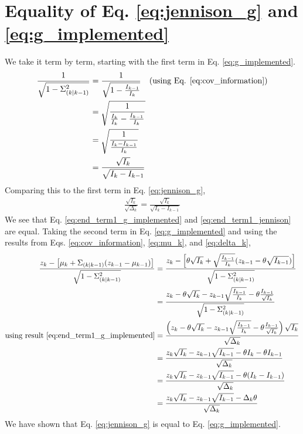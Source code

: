 \documentclass{article}
\begin{document}
\section{Equality of Eq. \eqref{eq:jennison_g} and \eqref{eq:g_implemented}}
\label{appendix:a}
%
We take it term by term, starting with the first term in Eq. \eqref{eq:g_implemented}.
\begin{align}
    \frac{1}{\sqrt{1 - \Sigma_{(k \mid k-1)}^2}}&=\frac{1}{\sqrt{1-\frac{I_{k-1}}{I_k}}}\quad\text{(using Eq. \eqref{eq:cov_information})} \\
    &=\sqrt{\frac{1}{\frac{I_k}{I_k}-\frac{I_{k-1}}{I_k}}}\\
    &=\sqrt{\frac{1}{\frac{I_k-I_{k-1}}{I_k}}}\\
    &=\frac{\sqrt{I_k}}{\sqrt{I_k-I_{k-1}}} \label{eq:end_term1_g_implemented}
\end{align}
%
Comparing this to the first term in Eq. \eqref{eq:jennison_g},
\begin{align}
    \frac{\sqrt{I_k}}{\sqrt{\Delta_k}} = \frac{\sqrt{I_k}}{\sqrt{I_k-I_{k-1}}} \label{eq:end_term1_jennison}
\end{align}
%
We see that Eq. \eqref{eq:end_term1_g_implemented} and \eqref{eq:end_term1_jennison} are equal. Taking the second term in Eq. \eqref{eq:g_implemented} and using the results from Eqs. \eqref{eq:cov_information}, \eqref{eq:mu_k}, and \eqref{eq:delta_k},
%
\begin{align}
    \frac{z_k-\left[\mu_k + \Sigma_{(k \mid k-1)}(z_{k-1} - \mu_{k-1})\right]}{\sqrt{1 - \Sigma_{(k \mid k-1)}^2}}&=\frac{z_k-\left[\theta\sqrt{I_k} + \sqrt{\frac{I_{k-1}}{I_k}}(z_{k-1} - \theta\sqrt{I_{k-1}})\right]}{\sqrt{1 - \Sigma_{(k \mid k-1)}^2}}\\
    &=\frac{z_k-\theta\sqrt{I_k} - z_{k-1}\sqrt{\frac{I_{k-1}}{I_k}} - \theta\frac{I_{k-1}}{\sqrt{I_k}}}{\sqrt{1 - \Sigma_{(k \mid k-1)}^2}}\\
    \text{using result \eqref{eq:end_term1_g_implemented}}&=\frac{\left(z_k-\theta\sqrt{I_k} - z_{k-1}\sqrt{\frac{I_{k-1}}{I_k}} - \theta\frac{I_{k-1}}{\sqrt{I_k}}\right)\sqrt{I_k}}{\sqrt{\Delta_k}}\\
    &=\frac{z_k\sqrt{I_k}-z_{k-1}\sqrt{I_{k-1}}-\theta I_k-\theta I_{k-1}}{\sqrt{\Delta_k}}\\
    &=\frac{z_k\sqrt{I_k}-z_{k-1}\sqrt{I_{k-1}}-\theta (I_k-I_{k-1})}{\sqrt{\Delta_k}}\\
    &=\frac{z_k\sqrt{I_k}-z_{k-1}\sqrt{I_{k-1}}-\Delta_k\theta}{\sqrt{\Delta_k}}
\end{align}
%
We have shown that Eq. \eqref{eq:jennison_g} is equal to Eq. \eqref{eq:g_implemented}.
%
\printbibliography
%
\end{document}
